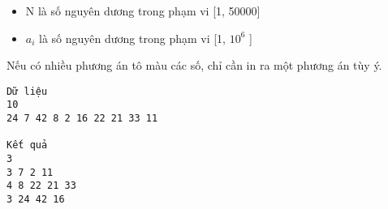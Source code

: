 \begin{itemize}
	\item     N là số nguyên dương trong phạm vi [1, 50000]   
	\item     $a_{i}$    là số nguyên dương trong phạm vi [1, $10^{6}$    ]   
\end{itemize}
Nếu có nhiều phương án tô màu các số, chỉ cần in ra một phương án tùy ý.
\begin{verbatim}
Dữ liệu
10
24 7 42 8 2 16 22 21 33 11	

Kết quả
3
3 7 2 11 
4 8 22 21 33 
3 24 42 16
\end{verbatim}